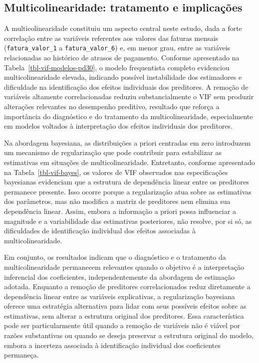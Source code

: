 \documentclass[
  brazilian,
  12pt,
  letterpaper,
  DIV=11,
  numbers=noendperiod]{scrartcl}
\begin{document}
\subsection{Multicolinearidade: tratamento e
implicações}\label{multicolinearidade-tratamento-e-implicauxe7uxf5es}

A multicolinearidade constituiu um aspecto central neste estudo, dada a
forte correlação entre as variáveis referentes aos valores das faturas
mensais (\texttt{fatura\_valor\_1} a \texttt{fatura\_valor\_6}) e, em
menor grau, entre as variáveis relacionadas ao histórico de atrasos de
pagamento. Conforme apresentado na Tabela~\ref{tbl-vif-modelos-pd30}, o
modelo frequentista completo evidenciou multicolinearidade elevada,
indicando possível instabilidade dos estimadores e dificuldade na
identificação dos efeitos individuais dos preditores. A remoção de
variáveis altamente correlacionadas reduziu substancialmente o VIF sem
produzir alterações relevantes no desempenho preditivo, resultado que
reforça a importância do diagnóstico e do tratamento da
multicolinearidade, especialmente em modelos voltados à interpretação
dos efeitos individuais dos preditores.

Na abordagem bayesiana, as distribuições a priori centradas em zero
introduzem um mecanismo de regularização que pode contribuir para
estabilizar as estimativas em situações de multicolinearidade.
Entretanto, conforme apresentado na Tabela~\ref{tbl-vif-bayes}, os
valores de VIF observados nas especificações bayesianas evidenciam que a
estrutura de dependência linear entre os preditores permanece presente.
Isso ocorre porque a regularização atua sobre as estimativas dos
parâmetros, mas não modifica a matriz de preditores nem elimina sua
dependência linear. Assim, embora a informação a priori possa
influenciar a magnitude e a variabilidade das estimativas posteriores,
não resolve, por si só, as dificuldades de identificação individual dos
efeitos associadas à multicolinearidade.

Em conjunto, os resultados indicam que o diagnóstico e o tratamento da
multicolinearidade permanecem relevantes quando o objetivo é a
interpretação inferencial dos coeficientes, independentemente da
abordagem de estimação adotada. Enquanto a remoção de preditores
correlacionados reduz diretamente a dependência linear entre as
variáveis explicativas, a regularização bayesiana oferece uma estratégia
alternativa para lidar com seus possíveis efeitos sobre as estimativas,
sem alterar a estrutura original dos preditores. Essa característica
pode ser particularmente útil quando a remoção de variáveis não é viável
por razões substantivas ou quando se deseja preservar a estrutura
original do modelo, embora a incerteza associada à identificação
individual dos coeficientes permaneça.
\end{document}
